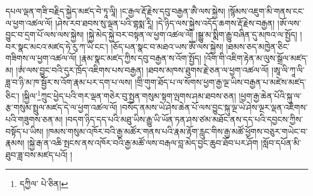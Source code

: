 དཔལ་ལྡན་གཟི་བརྗིད་སྐྱེད་མཛད་བེ་ཏཱ་ལཱི། །ང་རྒྱལ་རྡོ་རྗེས་དབུ་བརྒྱན་ཨཻ་ལས་སྐྱེས། །སྙོམས་འཇུག་མི་གནས་ངང་ལ་ཕྱག་འཚལ་ལོ། །ཤེས་རབ་ཐབས་སུ་ལྡན་པའི་གྷསྨ་རཱི། །དེ་ཉིད་ལས་སྐྱེས་འདོད་ཆགས་རྡོ་རྗེས་བརྒྱན། །ཨོ་ལས་བྱུང་བ་དྲག་པོ་ལས་ལས་སྐྱེས། །སྐྱེ་མེད་སྐྱེ་བར་བསྟན་ལ་ཕྱག་འཚལ་ལོ། །སྒྱུ་མ་སྨིག་རྒྱུ་བཞིན་དུ་མཁའ་ལ་སྤྱོད། །བར་སྣང་མངའ་མཛད་ཧེ་རུ་ཀ་ཡི་ངང་། །ཅོད་པན་སྣང་བ་མཐའ་ཡས་ཨཽ་ལས་སྐྱེས། །ཐམས་ཅད་མཁྱེན་ཅིང་གཟིགས་ལ་ཕྱག་འཚལ་ལོ། །རྣམ་སྣང་མཛད་ཀྱིས་དབུ་བརྒྱན་ས་འོག་སྤྱོད། །འོག་གི་འཇིག་རྟེན་མ་ལུས་སྒྲོལ་མཛད་མ། །ཨཾ་ལས་བྱུང་བའི་དུར་ཁྲོད་འཇིགས་པས་བརྒྱན། །ཐབས་མཁས་ཐུགས་རྗེ་ཅན་ལ་ཕྱག་འཚལ་ལོ། །ཨཱ་ལི་ཀཱ་ལི་ཟླ་བ་ཉི་མ་ཁ་སྦྱོར་ས་འོག་རྣམ་པར་དག་པ་ལས། །གྲི་གུག་ཐོད་པ་ལ་སོགས་ཕྱག་རྒྱ་ལྔ་ཡིས་བརྒྱན་པ་མཛེས་མཛད་ཅིང་། །སྐྱིལ་\footnote{དཀྱིལ་  པེ་ཅིན། }ཀྲུང་ཕྱེད་པའི་གར་ལྡན་གཅེར་བུ་སྤྱན་གསུམ་སྟག་ལྤགས་ཤམ་ཐབས་ཅན། །ཕྱག་རྒྱ་ཆེན་པོའི་སྐུ་ལ་རྩ་གསུམ་སྤྲུལ་མཛད་དེ་ལ་ཕྱག་འཚལ་ལོ། །བསོད་ནམས་ཡེ་ཤེས་ཆེན་པོ་ལས་བྱུང་སྐུ་ལྔ་ཡེ་ཤེས་ལྔར་ལྡན་འཇིགས་པའི་གཟུགས་ཅན་མ། །བདག་ཉིད་དད་པའི་མཐུ་ཡིས་རྒྱུ་ཡི་ཡོན་ཏན་ཤས་ཙམ་མཐོང་ནས་དད་པའི་དབྱངས་ཀྱིས་བསྟོད་པ་ཡིས། །ཁམས་གསུམ་འཁོར་བའི་རྒྱ་མཚོར་གནས་པའི་རྣམ་རྟོག་རླུང་གིས་རྒྱ་མཚོ་ཕྱོགས་བཅུར་གཡེང་བ་རྣམས། །སྐྱེ་རྒ་ན་འཆི་སྤངས་ནས་འཁོར་བའི་རྒྱ་མཚོ་ལས་བརྒལ་བླ་མེད་བྱང་ཆུབ་ཐོབ་པར་ཤོག །སློབ་དཔོན་མི་ཐུབ་ཟླ་བས་མཛད་པའོ། ། 